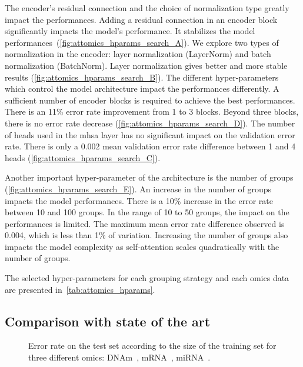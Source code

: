 \documentclass[../main.tex]{subfiles}
\begin{document}
	    The encoder's residual connection and the choice of normalization type greatly impact the performances.
	    Adding a residual connection in an encoder block significantly impacts the model's performance.
	    It stabilizes the model performances~(\cref{fig:attomics_hparams_search_A}).
	    We explore two types of normalization in the encoder: layer normalization (LayerNorm) and batch normalization (BatchNorm).
	    Layer normalization gives better and more stable results (\cref{fig:attomics_hparams_search_B}).
	    The different hyper-parameters which control the model architecture impact the performances differently.
	    A sufficient number of encoder blocks is required to achieve the best performances.
	    There is an 11\% error rate improvement from 1 to 3 blocks.
	    Beyond three blocks, there is no error rate decrease (\cref{fig:attomics_hparams_search_D}).
	    The number of heads used in the \gls{mhsa} layer has no significant impact on the validation error rate.
	    There is only a 0.002 mean validation error rate difference between 1 and 4 heads (\cref{fig:attomics_hparams_search_C}).

	    Another important hyper-parameter of the architecture is the number of groups (\cref{fig:attomics_hparams_search_E}).
	    An increase in the number of groups impacts the model performances.
	    There is a 10\% increase in the error rate between 10 and 100 groups.
	    In the range of 10 to 50 groups, the impact on the performances is limited.
	    The maximum mean error rate difference observed is 0.004, which is less than 1\% of variation.
	    Increasing the number of groups also impacts the model complexity as self-attention scales quadratically with the number of groups.

	    The selected hyper-parameters for each grouping strategy and each omics data are presented in~\cref{tab:attomics_hparams}.

	\subsection{Comparison with state of the art}

	    \begin{figure}[htbp]
	        \centering
	        \begin{subcaptiongroup}
	            \ifSubfilesClassLoaded{%
	            }{
	            }
	            \label{fig:limit_train_classif_A}
	            \label{fig:limit_train_classif_B}
	            \label{fig:limit_train_classif_C}
	        \end{subcaptiongroup}
	        \caption[Error rate comaprison of various architectures according to the training size]{Error rate on the test set according to the size of the training set for three different omics: DNAm~, mRNA~, miRNA~.}\label{fig:limit_train_classif}
	    \end{figure}
\end{document}
